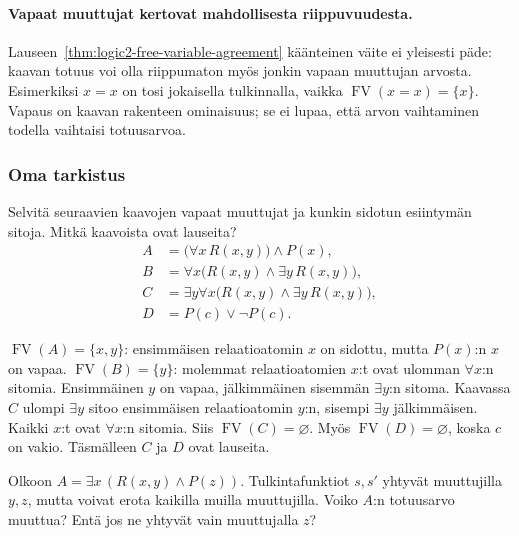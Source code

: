 \documentclass[11pt,a4paper]{amsart}
\begin{document}
\paragraph{Vapaat muuttujat kertovat mahdollisesta riippuvuudesta.}
Lauseen~\ref{thm:logic2-free-variable-agreement} käänteinen väite ei
yleisesti päde: kaavan totuus voi olla riippumaton myös jonkin vapaan
muuttujan arvosta. Esimerkiksi $x=x$ on tosi jokaisella tulkinnalla,
vaikka $\operatorname{FV}(x=x)=\{x\}$. Vapaus on kaavan rakenteen
ominaisuus; se ei lupaa, että arvon vaihtaminen todella vaihtaisi totuusarvoa.

\clearpage
\subsubsection{Oma tarkistus}

\begin{exercise}
  Selvitä seuraavien kaavojen vapaat muuttujat ja kunkin sidotun
  esiintymän sitoja. Mitkä kaavoista ovat lauseita?
  \begin{align*}
    A&=\bigl(\forall x\,R(x,y)\bigr)\land P(x),\\
    B&=\forall x\bigl(R(x,y)\land\exists y\,R(x,y)\bigr),\\
    C&=\exists y\forall x\bigl(R(x,y)\land\exists y\,R(x,y)\bigr),\\
    D&=P(c)\lor\neg P(c).
  \end{align*}
\end{exercise}

\begin{solution}
  $\operatorname{FV}(A)=\{x,y\}$: ensimmäisen relaatioatomin $x$
  on sidottu, mutta $P(x)$:n $x$ on vapaa.
  $\operatorname{FV}(B)=\{y\}$: molemmat relaatioatomien $x$:t
  ovat ulomman $\forall x$:n sitomia. Ensimmäinen $y$ on vapaa,
  jälkimmäinen sisemmän $\exists y$:n sitoma.
  Kaavassa $C$ ulompi $\exists y$ sitoo ensimmäisen relaatioatomin
  $y$:n, sisempi $\exists y$ jälkimmäisen. Kaikki $x$:t ovat
  $\forall x$:n sitomia. Siis $\operatorname{FV}(C)=\varnothing$.
  Myös $\operatorname{FV}(D)=\varnothing$, koska $c$ on vakio.
  Täsmälleen $C$ ja $D$ ovat lauseita.
\end{solution}

\begin{exercise}
  Olkoon $A=\exists x\,(R(x,y)\land P(z))$. Tulkintafunktiot $s,s'$
  yhtyvät muuttujilla $y,z$, mutta voivat erota kaikilla muilla
  muuttujilla. Voiko $A$:n totuusarvo muuttua?
  Entä jos ne yhtyvät vain muuttujalla $z$?
\end{exercise}
\end{document}
